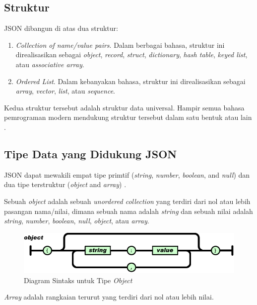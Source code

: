 \documentclass[a4paper, 12pt, oneside]{report}
\begin{document}
\subsection{Struktur}
\onehalfspacing JSON dibangun di atas dua struktur:
\begin{enumerate}
  \item \textit{Collection of name/value pairs}. Dalam berbagai bahasa, struktur ini direalisasikan sebagai \textit{object}, \textit{record}, \textit{struct}, \textit{dictionary}, \textit{hash table}, \textit{keyed list}, atau \textit{associative array}.
  \item \textit{Ordered List}. Dalam kebanyakan bahasa, struktur ini direalisasikan sebagai \textit{array}, \textit{vector}, \textit{list}, atau \textit{sequence}.
\end{enumerate}

\onehalfspacing Kedua struktur tersebut adalah struktur data universal. Hampir semua bahasa pemrograman modern mendukung struktur tersebut dalam satu bentuk atau lain \cite{introducing-json}.

\subsection{Tipe Data yang Didukung JSON}
\onehalfspacing JSON dapat mewakili empat tipe primtif (\textit{string}, \textit{number}, \textit{boolean}, and \textit{null}) dan dua tipe terstruktur (\textit{object} and \textit{array}) \cite{rfc-4627}.

\onehalfspacing Sebuah \textit{object} adalah sebuah \textit{unordered collection} yang terdiri dari nol atau lebih pasangan nama/nilai, dimana sebuah nama adalah \textit{string} dan sebuah nilai adalah \textit{string}, \textit{number}, \textit{boolean}, \textit{null}, \textit{object}, atau \textit{array}.

\begin{figure}[htp]
\centering
\includegraphics[scale=0.55]{images/object-json.png}
\caption{Diagram Sintaks untuk Tipe \textit{Object} \cite{json-fat-free}}
\label{Diagram Sintaks untuk Tipe Object}
\end{figure}

\onehalfspacing \textit{Array} adalah rangkaian terurut yang terdiri dari nol atau lebih nilai.
\end{document}
